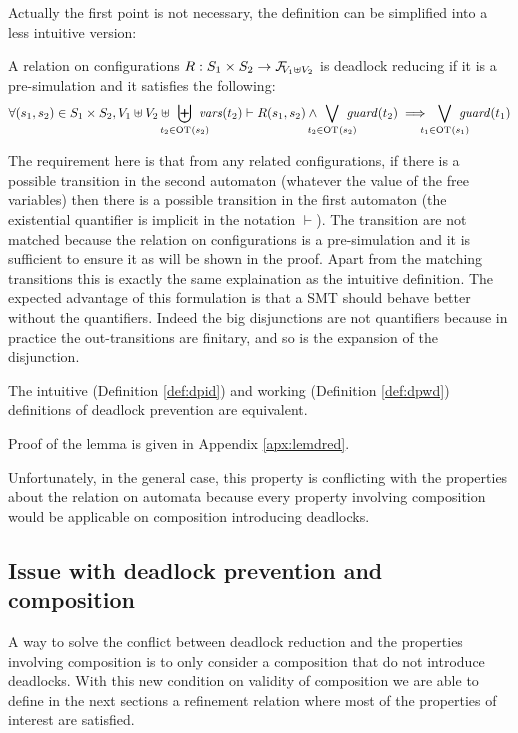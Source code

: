 \documentclass{article}
\begin{document}
Actually the first point is not necessary, the definition can be simplified into a less intuitive version:
\begin{defi}\label{def:dpwd}
A relation on configurations \(R: S_1 \times S_2 \to \rformulas[V_1 \uplus V_2]\) is deadlock reducing if it is a pre-simulation and it satisfies the following:
\[ \forall \mpar{s_1, s_2} \in S_1 \times S_2, V_1 \uplus V_2 \uplus \biguplus_\subbox{t_2 \in \fOT{s_2}} \fvars{t_2} \vdash R\mpar{s_1, s_2} \wedge \bigvee_\subbox{t_2 \in \fOT{s_2}} \fguard{t_2} \implies \bigvee_\subbox{t_1 \in \fOT{s_1}} \fguard{t_1} \]
\end{defi}
The requirement here is that from any related configurations, if there is a possible transition in the second automaton (whatever the value of the free variables) then there is a possible transition in the first automaton (the existential quantifier is implicit in the notation \(\vdash\)).
The transition are not matched because the relation on configurations is a pre-simulation and it is sufficient to ensure it as will be shown in the proof.
Apart from the matching transitions this is exactly the same explaination as the intuitive definition.
The expected advantage of this formulation is that a SMT should behave better without the quantifiers.
Indeed the big disjunctions are not quantifiers because in practice the out-transitions are finitary, and so is the expansion of the disjunction.
\begin{lem}\label{lem:dred}
The intuitive (Definition \ref{def:dpid}) and working (Definition \ref{def:dpwd}) definitions of deadlock prevention are equivalent.
\end{lem}
Proof of the lemma is given in Appendix \ref{apx:lemdred}.

Unfortunately, in the general case, this property is conflicting with the properties about the relation on automata because every property involving composition would be applicable on composition introducing deadlocks.

\subsection{Issue with deadlock prevention and composition}
A way to solve the conflict between deadlock reduction and the properties involving composition is to only consider a composition that do not introduce deadlocks.
With this new condition on validity of composition we are able to define in the next sections a refinement relation where most of the properties of interest are satisfied.
\end{document}
